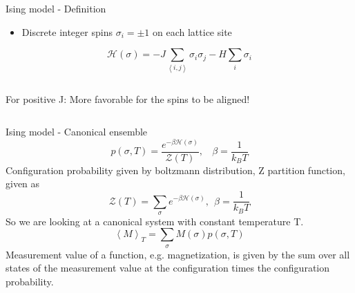 \documentclass[]{beamer}
\begin{document}
\begin{frame}{Ising model - Definition}
\begin{itemize}
	 {Lattice with \(N\) sites.}
\item<2-> Discrete integer spins \( \sigma_i = \pm 1 \) on each lattice site
\end{itemize}
\pause[3]
\[ \mathscr{H}(\sigma) = -J \sum\limits_{\left< i, j \right>} \sigma_i \sigma_j - H \sum\limits_i \sigma_i \]

\begin{columns}[c]
	\pause
	\def\svgwidth{.5\textwidth}
	\centering
	
	\pause
	\def\svgwidth{.5\textwidth}
	\centering
	
		 {For positive J: More favorable for the spins to be aligned!}
\end{columns}
\end{frame}

\begin{frame}{Ising model - Canonical ensemble}
\pause
\[ p(\sigma, T) = \frac{e^{-\beta \mathscr{H}(\sigma)}}{\mathscr{Z}(T)}, \ \ \ \ \beta=\frac{1}{k_B T}\]
	 {Configuration probability given by boltzmann distribution, Z partition function, given as \[ \mathscr{Z}(T) = \sum_\sigma e^{-\beta \mathscr{H}(\sigma)},\ \ \beta = \frac{1}{k_B T} \]}
	 {So we are looking at a canonical system with constant temperature T.}
\pause
\[ \left< M \right>_T = \sum_\sigma M(\sigma)p(\sigma,T) \]
	 {Measurement value of a function, e.g. magnetization, is given by the sum over all states of the measurement value at the configuration times the configuration probability.}
\end{frame}
\end{document}
